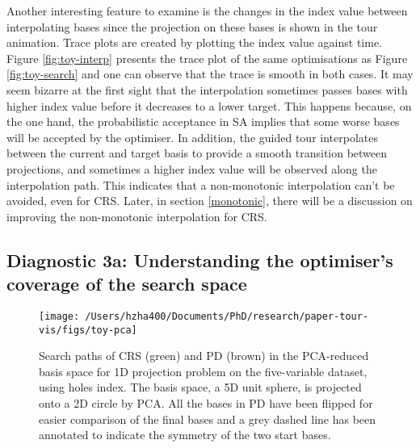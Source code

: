 Another interesting feature to examine is the changes in the index value
between interpolating bases since the projection on these bases is shown
in the tour animation. Trace plots are created by plotting the index
value against time. Figure \ref{fig:toy-interp} presents the trace plot
of the same optimisations as Figure \ref{fig:toy-search} and one can
observe that the trace is smooth in both cases. It may seem bizarre at
the first sight that the interpolation sometimes passes bases with
higher index value before it decreases to a lower target. This happens
because, on the one hand, the probabilistic acceptance in SA implies
that some worse bases will be accepted by the optimiser. In addition,
the guided tour interpolates between the current and target basis to
provide a smooth transition between projections, and sometimes a higher
index value will be observed along the interpolation path. This
indicates that a non-monotonic interpolation can't be avoided, even for
CRS. Later, in section \ref{monotonic}, there will be a discussion on
improving the non-monotonic interpolation for CRS.

\hypertarget{toy-pca}{%
\subsection{Diagnostic 3a: Understanding the optimiser's coverage of the
search space}\label{toy-pca}}

\begin{Schunk}
\begin{figure}

{\centering \texttt{[image: /Users/hzha400/Documents/PhD/research/paper-tour-vis/figs/toy-pca]} 

}

\caption[Search paths of CRS (green) and PD (brown) in the PCA-reduced basis space for 1D projection problem on the five-variable dataset,  using holes index]{Search paths of CRS (green) and PD (brown) in the PCA-reduced basis space for 1D projection problem on the five-variable dataset,  using holes index. The basis space, a 5D unit sphere, is projected onto a 2D circle by PCA. All the bases in PD have been flipped for easier comparison of the final bases and a grey dashed line has been annotated to indicate the symmetry of the two start bases.}\label{fig:toy-pca}
\end{figure}
\end{Schunk}

